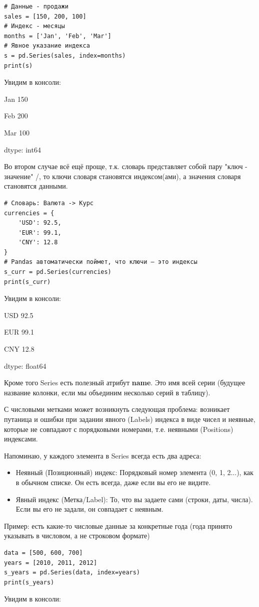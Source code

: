 \documentclass[pract]{SCWorks}
\begin{document}
\begin{verbatim}
# Данные - продажи
sales = [150, 200, 100]
# Индекс - месяцы
months = ['Jan', 'Feb', 'Mar']
# Явное указание индекса
s = pd.Series(sales, index=months)
print(s)
\end{verbatim}
Увидим в консоли:

Jan    150

Feb    200

Mar    100

dtype: int64

Во втором случае всё ещё проще, т.к. словарь представляет собой пару "ключ - значение" /, то ключи 
словаря становятся индексом(ами), а значения словаря становятся данными.

\begin{verbatim}
# Словарь: Валюта -> Курс
currencies = {
    'USD': 92.5,
    'EUR': 99.1,
    'CNY': 12.8
}
# Pandas автоматически поймет, что ключи — это индексы
s_curr = pd.Series(currencies)
print(s_curr)
\end{verbatim}
Увидим в консоли:

USD    92.5

EUR    99.1

CNY    12.8

dtype: float64

Кроме того Series есть полезный атрибут \textbf{name}. Это имя всей серии (будущее название колонки, 
если мы объединим несколько серий в таблицу).

С числовыми метками может возникнуть следующая проблема: возникает путаница и ошибки при задании явного 
(Labels) индекса в виде чисел и неявные, которые не совпадают с порядковыми номерами, т.е. неявными 
(Positions) индексами. 

Напоминаю, у каждого элемента в Series всегда есть два адреса:
\begin{itemize}
    \item Неявный (Позиционный) индекс: Порядковый номер элемента (0, 1, 2...), как в обычном списке. 
    Он есть всегда, даже если вы его не видите.
    \item Явный индекс (Метка/Label): То, что вы задаете сами (строки, даты, числа). 
    Если вы его не задали, он совпадает с неявным.
\end{itemize}

Пример: есть какие-то числовые данные за конкретные года (года принято указывать в числовом, а не строковом формате)

\begin{verbatim}
data = [500, 600, 700]
years = [2010, 2011, 2012]
s_years = pd.Series(data, index=years)
print(s_years)
\end{verbatim}
Увидим в консоли:
\end{document}
